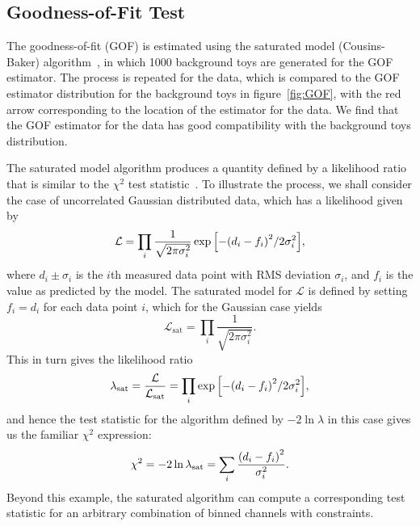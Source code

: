 \subsection{Goodness-of-Fit Test}

The goodness-of-fit (GOF) is estimated using the saturated model (Cousins-Baker) algorithm~\cite{Baker1984437}, in which 1000 background toys are generated for the GOF estimator.
The process is repeated for the data, which is compared to the GOF estimator distribution for the background toys in figure~\ref{fig:GOF}, with the red arrow corresponding to the location of the estimator for the data.
We find that the GOF estimator for the data has good compatibility with the background toys distribution.

The saturated model algorithm produces a quantity defined by a likelihood ratio that is similar to the $\chi^2$ test statistic~\cite{Cousins2013}.
To illustrate the process, we shall consider the case of uncorrelated Gaussian distributed data, which has a likelihood given by
\begin{equation}
  \mathcal{L}=\prod_i\frac{1}{\sqrt{2\pi\sigma_i^2}}\exp\bqty{-\pqty{d_i-f_i}^2/2\sigma_i^2},
\end{equation}
where $d_i\pm\sigma_i$ is the $i$th measured data point with RMS deviation $\sigma_i$, and $f_i$ is the value as predicted by the model.
The saturated model for $\mathcal{L}$ is defined by setting $f_i=d_i$ for each data point $i$, which for the Gaussian case yields
\begin{equation}
  \mathcal{L}_\mathrm{sat}=\prod_i\frac{1}{\sqrt{2\pi\sigma_i^2}}.
\end{equation}
This in turn gives the likelihood ratio
\begin{equation}
  \lambda_\mathrm{sat}=\frac{\mathcal{L}}{\mathcal{L}_\mathrm{sat}}=\prod_i\exp\bqty{-\pqty{d_i-f_i}^2/2\sigma_i^2},
\end{equation}
and hence the test statistic for the algorithm defined by $-2\ln\lambda$ in this case gives us the familiar $\chi^2$ expression:
\begin{equation}
  \chi^2=-2\ln\lambda_\mathrm{sat}=\sum_i\frac{\pqty{d_i-f_i}^2}{\sigma_i^2}.
\end{equation}
Beyond this example, the saturated algorithm can compute a corresponding test statistic for an arbitrary combination of binned channels with constraints.

